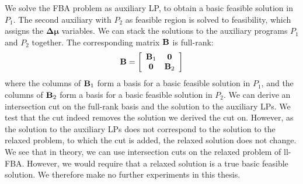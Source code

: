 We solve the \textsf{FBA} problem as auxiliary LP, to obtain a basic feasible solution in $P_1$. The second auxiliary with $P_2$ as feasible region is solved to feasibility, which assigns the $\boldsymbol{\Delta \mu}$ variables. We can stack the solutions to the auxiliary programs $P_1$ and $P_2$ together. The corresponding matrix $\bold B$ is full-rank: 
\begin{equation*}
    \bold B = 
    \left[\begin{array}{cc} 
        \bold B_1 & \bold 0 \\
       \bold 0 & \bold B_2
    \end{array}\right]
\end{equation*}
\quad where the columns of $\bold B_1$ form a basis for a basic feasible solution in $P_1$, and the columns of $\bold B_2$ form a basis for a basic feasible solution in $P_2$.
We can derive an intersection cut on the full-rank basis and the solution to the auxiliary LPs. We test that the cut indeed removes the solution we derived the cut on. However, as the solution to the auxiliary LPs does not correspond to the solution to the relaxed problem, to which the cut is added, the relaxed solution does not change. \\
We see that in theory, we can use intersection cuts on the relaxed problem of \textsf{ll-FBA}. However, we would require that a relaxed solution is a true basic feasible solution. We therefore make no further experiments in this thesis.

